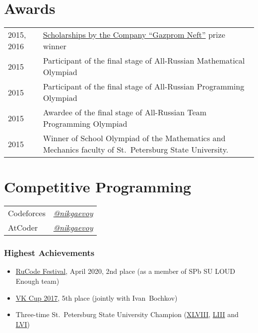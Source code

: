 \documentclass[a4paper, 11pt]{article}
\begin{document}
\section*{Awards}

\begin{tabularx}{\textwidth}{lX}
    2015, 2016 & \href{https://math-cs.spbu.ru/en/scholarships-rodnye-goroda/}{Scholarships by the Company ``Gazprom Neft''} prize winner \\

    2015 & Participant of the final stage of All-Russian Mathematical Olympiad \\
    
    2015 & Participant of the final stage of All-Russian Programming Olympiad \\
    
    2015 & Awardee of the final stage of All-Russian Team Programming Olympiad \\

    2015 & Winner of School Olympiad of the Mathematics and Mechanics faculty of St.~Petersburg State University.
\end{tabularx}

\section*{Competitive Programming}

\begin{tabular}{ll}
    Codeforces & \href{https://codeforces.com/profile/nikgaevoy}{{\it @nikgaevoy}} \\
    AtCoder & \href{https://atcoder.jp/users/nikgaevoy}{{\it @nikgaevoy}}
\end{tabular}

\subsubsection*{Highest Achievements}

\begin{itemize}
    \item \href{http://rucode.it-edu.mipt.ru/rucode2020resAB}{RuCode Festival}, April 2020, 2nd place (as a member of SPb SU LOUD Enough team)
    
    \item \href{https://codeforces.com/blog/entry/53192}{VK Cup 2017}, 5th place (jointly with Ivan~Bochkov)
    
    \item Three-time St.~Petersburg State University Champion (\href{https://acm.math.spbu.ru/cgi-bin/monitor.pl/n171015.dat}{XLVIII}, \href{https://acm.math.spbu.ru/cgi-bin/monitor.pl/n190421.dat}{LIII} and \href{https://acm.math.spbu.ru/cgi-bin/monitor.pl/n201206.dat}{LVI})
\end{itemize}
\end{document}
